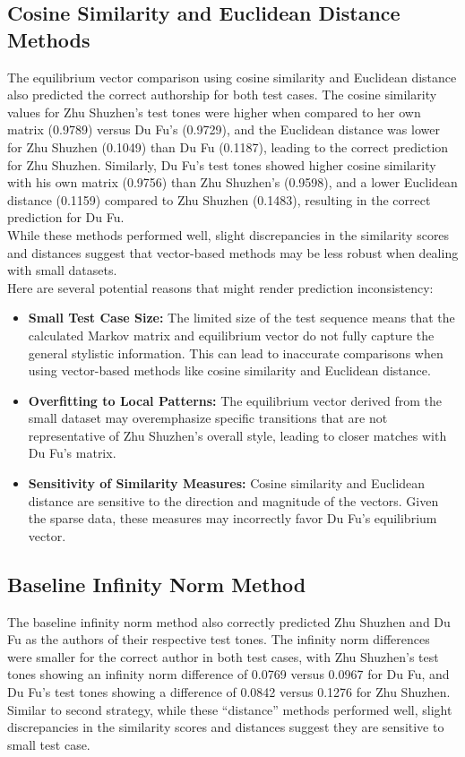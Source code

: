 \documentclass[12pt]{article}
\begin{document}
\subsection*{Cosine Similarity and Euclidean Distance Methods}
The equilibrium vector comparison using cosine similarity and Euclidean distance also predicted the correct authorship for both test cases. 
The cosine similarity values for Zhu Shuzhen's test tones were higher when compared to her own matrix (0.9789) versus Du Fu’s (0.9729), and the Euclidean distance was lower for Zhu Shuzhen (0.1049) than Du Fu (0.1187), leading to the correct prediction for Zhu Shuzhen. 
Similarly, Du Fu's test tones showed higher cosine similarity with his own matrix (0.9756) than Zhu Shuzhen's (0.9598), and a lower Euclidean distance (0.1159) compared to Zhu Shuzhen (0.1483), resulting in the correct prediction for Du Fu.
\\
While these methods performed well, slight discrepancies in the similarity scores and distances suggest that vector-based methods may be less robust when dealing with small datasets.
\\
\noindent Here are several potential reasons that might render prediction inconsistency:
\begin{itemize}
    \item \textbf{Small Test Case Size:} The limited size of the test sequence means that the calculated Markov matrix and equilibrium vector do not fully capture the general stylistic information. This can lead to inaccurate comparisons when using vector-based methods like cosine similarity and Euclidean distance.
    \item \textbf{Overfitting to Local Patterns:} The equilibrium vector derived from the small dataset may overemphasize specific transitions that are not representative of Zhu Shuzhen’s overall style, leading to closer matches with Du Fu's matrix.
    \item \textbf{Sensitivity of Similarity Measures:} Cosine similarity and Euclidean distance are sensitive to the direction and magnitude of the vectors. Given the sparse data, these measures may incorrectly favor Du Fu's equilibrium vector.
\end{itemize}

\subsection*{Baseline Infinity Norm Method}
The baseline infinity norm method also correctly predicted Zhu Shuzhen and Du Fu as the authors of their respective test tones. The infinity norm differences were smaller for the correct author in both test cases, with Zhu Shuzhen's test tones showing an infinity norm difference of 0.0769 versus 0.0967 for Du Fu, and Du Fu's test tones showing a difference of 0.0842 versus 0.1276 for Zhu Shuzhen.
\\
Similar to second strategy, while these ``distance'' methods performed well, slight discrepancies in the similarity scores and distances suggest they are sensitive to small test case.
\end{document}
